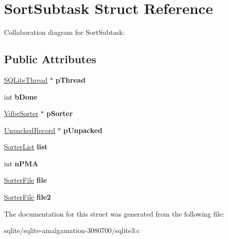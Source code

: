 \hypertarget{struct_sort_subtask}{\section{Sort\+Subtask Struct Reference}
\label{struct_sort_subtask}
}


Collaboration diagram for Sort\+Subtask\+:
\subsection*{Public Attributes}
\begin{DoxyCompactItemize}
\item 
\hypertarget{struct_sort_subtask_abb534010ac35e0c37e41c26712e7b58c}{\hyperlink{struct_s_q_lite_thread}{S\+Q\+Lite\+Thread} $\ast$ {\bfseries p\+Thread}}\label{struct_sort_subtask_abb534010ac35e0c37e41c26712e7b58c}

\item 
\hypertarget{struct_sort_subtask_a156fc75053f13e877c36d80885338060}{int {\bfseries b\+Done}}\label{struct_sort_subtask_a156fc75053f13e877c36d80885338060}

\item 
\hypertarget{struct_sort_subtask_a2a8ec6b4b0d29090e3b33b1a6647655a}{\hyperlink{struct_vdbe_sorter}{Vdbe\+Sorter} $\ast$ {\bfseries p\+Sorter}}\label{struct_sort_subtask_a2a8ec6b4b0d29090e3b33b1a6647655a}

\item 
\hypertarget{struct_sort_subtask_af2312bacbb7e4cbe905eae20a60a3f39}{\hyperlink{struct_unpacked_record}{Unpacked\+Record} $\ast$ {\bfseries p\+Unpacked}}\label{struct_sort_subtask_af2312bacbb7e4cbe905eae20a60a3f39}

\item 
\hypertarget{struct_sort_subtask_a0a79fd21798a08ceede3febbd08c88a2}{\hyperlink{struct_sorter_list}{Sorter\+List} {\bfseries list}}\label{struct_sort_subtask_a0a79fd21798a08ceede3febbd08c88a2}

\item 
\hypertarget{struct_sort_subtask_a6ecceaeda562346b298aa9fb95355071}{int {\bfseries n\+P\+M\+A}}\label{struct_sort_subtask_a6ecceaeda562346b298aa9fb95355071}

\item 
\hypertarget{struct_sort_subtask_a077f999ff1e4148e48bd8df25092fd85}{\hyperlink{struct_sorter_file}{Sorter\+File} {\bfseries file}}\label{struct_sort_subtask_a077f999ff1e4148e48bd8df25092fd85}

\item 
\hypertarget{struct_sort_subtask_a23b46687f7a96ef1052a062f8097234e}{\hyperlink{struct_sorter_file}{Sorter\+File} {\bfseries file2}}\label{struct_sort_subtask_a23b46687f7a96ef1052a062f8097234e}

\end{DoxyCompactItemize}


The documentation for this struct was generated from the following file\+:\begin{DoxyCompactItemize}
\item 
sqlite/sqlite-\/amalgamation-\/3080700/sqlite3.\+c\end{DoxyCompactItemize}

